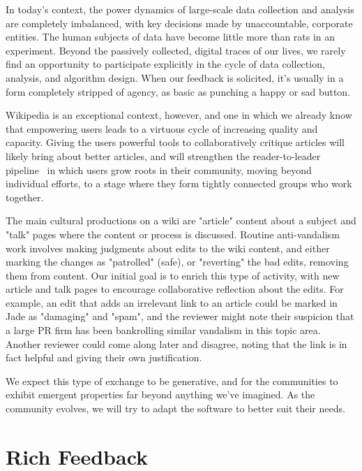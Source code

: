 \documentclass[sigconf, anonymous, review]{acmart}
\begin{document}
In today's context, the power dynamics of large-scale data collection and analysis are completely imbalanced, with key decisions made by unaccountable, corporate entities.  The human subjects of data have become little more than rats in an experiment.  Beyond the passively collected, digital traces of our lives, we rarely find an opportunity to participate explicitly in the cycle of data collection, analysis, and algorithm design.  When our feedback is solicited, it's usually in a form completely stripped of agency, as basic as punching a happy or sad button.\cite{levaniemi2012indicator}

Wikipedia is an exceptional context, however, and one in which we already know that empowering users leads to a virtuous cycle of increasing quality and capacity.  Giving the users powerful tools to collaboratively critique articles will likely bring about better articles, and will strengthen the reader-to-leader pipeline~\cite{preece2009reader} in which users grow roots in their community, moving beyond individual efforts, to a stage where they form tightly connected groups who work together.

The main cultural productions on a wiki are "article" content about a subject and "talk" pages where the content or process is discussed.  Routine anti-vandalism work involves making judgments about edits to the wiki content, and either marking the changes as "patrolled" (safe), or "reverting" the bad edits, removing them from content.  Our initial goal is to enrich this type of activity, with new article and talk pages to encourage collaborative reflection about the edits.  For example, an edit that adds an irrelevant link to an article could be marked in Jade as "damaging" and "spam", and the reviewer might note their suspicion that a large PR firm has been bankrolling similar vandalism in this topic area.  Another reviewer could come along later and disagree, noting that the link is in fact helpful and giving their own justification.

We expect this type of exchange to be generative, and for the communities to exhibit emergent properties far beyond anything we've imagined.  As the community evolves, we will try to adapt the software to better suit their needs.

\section{Rich Feedback}
\end{document}
